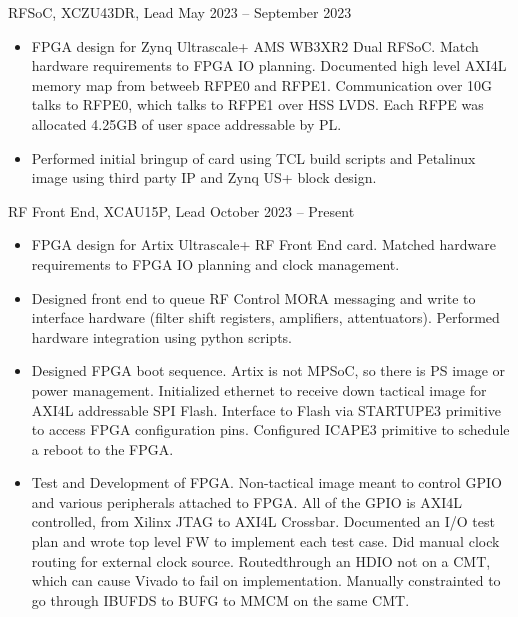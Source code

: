 \documentclass[10pt,final,sans]{resume}
\begin{document}
\begin{adjustwidth}{.5cm}{}
   { RFSoC, XCZU43DR, Lead } { May 2023 -- September 2023 }
  \begin{itemize}
    \item FPGA design for Zynq Ultrascale+ AMS WB3XR2 Dual RFSoC. Match hardware requirements to FPGA IO planning. Documented high level AXI4L memory map from betweeb RFPE0 and RFPE1. Communication over 10G talks to RFPE0, which talks to RFPE1 over HSS LVDS. Each RFPE was allocated 4.25GB of user space addressable by PL.
    \item Performed initial bringup of card using TCL build scripts and Petalinux image using third party IP and Zynq US+ block design.
  \end{itemize}
\end{adjustwidth}


\begin{adjustwidth}{.5cm}{}
   { RF Front End, XCAU15P, Lead } { October 2023 -- Present }
  \begin{itemize}
    \item FPGA design for Artix Ultrascale+ RF Front End card. Matched hardware requirements to FPGA IO planning and clock management.
    \item Designed front end to queue RF Control MORA messaging and write to interface hardware (filter shift registers, amplifiers, attentuators). Performed hardware integration using python scripts.
    \item Designed FPGA boot sequence. Artix is not MPSoC, so there is PS image or power management. Initialized ethernet to receive down tactical image for AXI4L addressable SPI Flash. Interface to Flash via STARTUPE3 primitive to access FPGA configuration pins. Configured ICAPE3 primitive to schedule a reboot to the FPGA. 
    \item Test and Development of FPGA. Non-tactical image meant to control GPIO and various peripherals attached to FPGA. All of the GPIO is AXI4L controlled, from Xilinx JTAG to AXI4L Crossbar. Documented an I/O test plan and wrote top level FW to implement each test case. Did manual clock routing for external clock source. Routedthrough an HDIO not on a CMT, which can cause Vivado to fail on implementation. Manually constrainted to go through IBUFDS to BUFG to MMCM on the same CMT.
  \end{itemize}
\end{adjustwidth}
\end{document}
